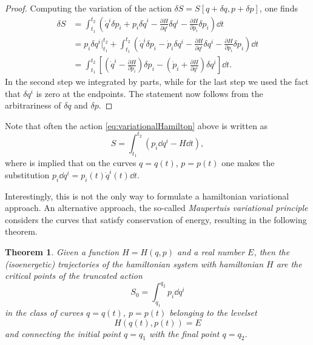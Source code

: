 \documentclass[english,fontsize=11pt,paper=b5]{scrbook}
\newtheorem{theorem}{Theorem}[chapter]
\theoremstyle{definition}
\begin{document}
    \begin{proof}
      Computing the variation of the action $\delta S = S[q+\delta q, p + \delta p]$, one finds
      \begin{align}
        \delta S
     & = \int_{t_1}^{t_2} \left( \dot q^i \delta p_i + p_i \delta \dot q^i - \frac{\partial H}{\partial q^i}\delta q^i - \frac{\partial H}{\partial p_i}\delta p_i \right) \dd t                                   \\
     & = p_i \delta q^i\Big|_{t_1}^{t_2} + \int_{t_1}^{t_2} \left( \dot q^i \delta p_i - \dot p_i \delta q^i - \frac{\partial H}{\partial q^i}\delta q^i - \frac{\partial H}{\partial p_i}\delta p_i \right) \dd t \\
     & = \int_{t_1}^{t_2} \left[
       \left(\dot q^i - \frac{\partial H}{\partial p_i} \right) \delta p_i
       - \left(\dot p_i + \frac{\partial H}{\partial q^i}\right) \delta q^i
     \right] \dd t.
      \end{align}
      In the second step we integrated by parts, while for the last step we used the fact that $\delta q^i$ is zero at the endpoints.
      The statement now follows from the arbitrariness of $\delta q$ and $\delta p$.
    \end{proof}

    Note that often the action \eqref{eq:variationalHamilton} above is written as
    \begin{equation}
      S = \int_{t_1}^{t_2} (p_i \dd q^i - H \dd t),
    \end{equation}
    where is implied that on the curves $q=q(t)$, $p=p(t)$ one makes the substitution $p_i \dd q^i = p_i(t) \dot q^i (t) \dd t$.

    Interestingly, this is not the only way to formulate a hamiltonian variational approach.
    An alternative approach, the so-called \emph{Maupertuis variational principle} considers the curves that satisfy conservation of energy, resulting in the following theorem.

    \begin{theorem}
      Given a function $H=H(q,p)$ and a real number $E$, then the (isoenergetic) \emph{trajectories} of the hamiltonian system with hamiltonian $H$ are the critical points of the truncated action
      \begin{equation}\label{eq:variationalMaupertuis}
        S_0 = \int_{q_1}^{q_2} p_i \dd q^i
      \end{equation}
      in the class of curves $q=q(t)$, $p=p(t)$ belonging to the levelset
      \begin{equation}
        H(q(t),p(t)) = E
      \end{equation}
      and connecting the initial point $q=q_1$ with the final point $q=q_2$.
    \end{theorem}
\end{document}
